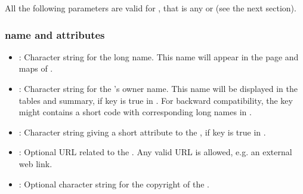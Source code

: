 

All the following parameters are valid for , that is any  or  (see the next section).

\subsubsection{ name and attributes}
\begin{itemize}

\item {}: Character string for the  long name. This name will appear in the  page and maps of .

\item {}: Character string for the 's owner name. This name will be displayed in the  tables and  summary, if  key is true in . For backward compatibility, the key might contains a short code with corresponding long names in .

%

\item {}: Character string giving a short attribute to the , if  key is true in .

\item {}: Optional URL related to the . Any valid URL is allowed, e.g. an external web link.

\item {}: Optional character string for the copyright of the .

\end{itemize}


